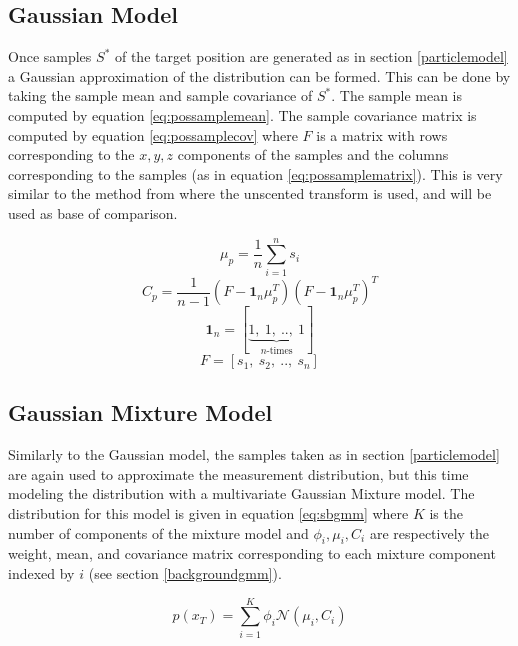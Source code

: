 \documentclass[journal]{IEEEtran}
\begin{document}
\subsection{Gaussian Model} \label{gaussianmodel}
Once samples $S^*$ of the target position are generated as in section \ref{particlemodel} a Gaussian approximation of the distribution can be formed. This can be done by taking the sample mean and sample covariance of $S^*$. The sample mean is computed by equation \ref{eq:possamplemean}. The sample covariance matrix is computed by equation \ref{eq:possamplecov} where $F$ is a matrix with rows corresponding to the $x,y,z$ components of the samples and the columns corresponding to the samples (as in equation \ref{eq:possamplematrix}). This is very similar to the method from \cite{kim2009terrain} where the unscented transform is used, and will be used as base of comparison.

\begin{dmath} \label{eq:possamplemean}
    {\mu_p = \frac{1}{n} \sum_{i = 1}^n s_i}
\end{dmath}
\begin{dmath} \label{eq:possamplecov}
    {C_p = \frac{1}{n - 1} (F - \mathbf{1}_n \mu_p^T) (F - \mathbf{1}_n \mu_p^T)^T }
\end{dmath}
\begin{dmath} \label{eq:posonesvec}
    {\mathbf{1}_n = [\underbrace{1,\ 1,\ ..,\ 1}_{n\text{-times}}]}
\end{dmath}
\begin{dmath} \label{eq:possamplematrix}
    {F = [s_1,\ s_2,\ ..,\ s_n]}
\end{dmath}

\subsection{Gaussian Mixture Model} \label{gaussianmixturemodel}
Similarly to the Gaussian model, the samples taken as in section \ref{particlemodel} are again used to approximate the measurement distribution, but this time modeling the distribution with a multivariate Gaussian Mixture model. The distribution for this model is given in equation \ref{eq:sbgmm} where $K$ is the number of components of the mixture model and $\phi_i, \mu_i, C_i$ are respectively the weight, mean, and covariance matrix corresponding to each mixture component indexed by $i$ (see section \ref{backgroundgmm}).

\begin{dmath} \label{eq:sbgmm}
    { p(x_T) = \sum_{i = 1}^K \phi_i \mathcal{N}(\mu_i, C_i) }
\end{dmath}
\end{document}
